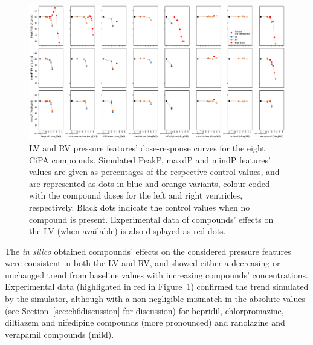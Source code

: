 \begin{figure}[ht!]
    \myfloatalign
    \includegraphics[width=\textwidth]{figures/chapter06/simulated_cipa_compounds_effects_on_lv_rv_pressure_features_with_expdata.pdf}
    \caption{LV and RV pressure features' dose-response curves for the eight CiPA compounds. Simulated PeakP, maxdP and mindP features' values are given as percentages of the respective control values, and are represented as dots in blue and orange variants, colour-coded with the compound doses for the left and right ventricles, respectively. Black dots indicate the control values when no compound is present. Experimental data of compounds' effects on the LV (when available) is also displayed as red dots.}
    \label{fig:LVRVfeatsalldrugsrespcurves}
\end{figure}

\vspace{0.2cm}
The \textit{in silico} obtained compounds' effects on the considered pressure features were consistent in both the LV and RV, and showed either a decreasing or unchanged trend from baseline values with increasing compounds' concentrations. Experimental data (highlighted in red in Figure~\ref{fig:LVRVfeatsalldrugsrespcurves}) confirmed the trend simulated by the simulator, although with a non-negligible mismatch in the absolute values (see Section~\ref{sec:ch6discussion} for discussion) for bepridil, chlorpromazine, diltiazem and nifedipine compounds (more pronounced) and ranolazine and verapamil compounds (mild).


%
%
%
